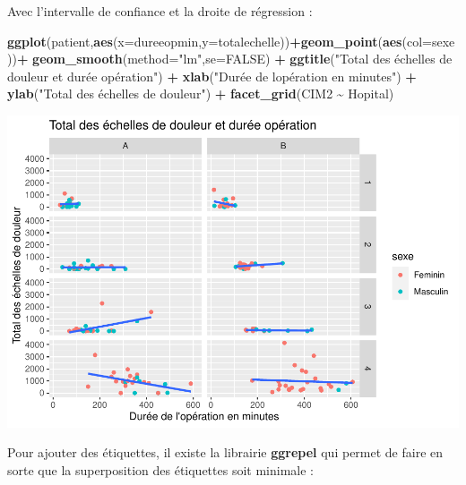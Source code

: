 \documentclass[
]{book}
\newenvironment{Shaded}{\begin{snugshade}}{\end{snugshade}}
\newcommand{\AttributeTok}[1]{\textcolor[rgb]{0.13,0.29,0.53}{#1}}
\newcommand{\ConstantTok}[1]{\textcolor[rgb]{0.56,0.35,0.01}{#1}}
\newcommand{\FunctionTok}[1]{\textcolor[rgb]{0.13,0.29,0.53}{\textbf{#1}}}
\newcommand{\NormalTok}[1]{#1}
\newcommand{\SpecialCharTok}[1]{\textcolor[rgb]{0.81,0.36,0.00}{\textbf{#1}}}
\newcommand{\StringTok}[1]{\textcolor[rgb]{0.31,0.60,0.02}{#1}}
\begin{document}
Avec l'intervalle de confiance et la droite de régression :

\begin{Shaded}
\begin{Highlighting}[]
\FunctionTok{ggplot}\NormalTok{(patient,}\FunctionTok{aes}\NormalTok{(}\AttributeTok{x=}\NormalTok{dureeopmin,}\AttributeTok{y=}\NormalTok{totalechelle))}\SpecialCharTok{+}\FunctionTok{geom\_point}\NormalTok{(}\FunctionTok{aes}\NormalTok{(}\AttributeTok{col=}\NormalTok{sexe))}\SpecialCharTok{+}
  \FunctionTok{geom\_smooth}\NormalTok{(}\AttributeTok{method=}\StringTok{"lm"}\NormalTok{,}\AttributeTok{se=}\ConstantTok{FALSE}\NormalTok{) }\SpecialCharTok{+}
  \FunctionTok{ggtitle}\NormalTok{(}\StringTok{"Total des échelles de douleur et durée opération"}\NormalTok{) }\SpecialCharTok{+} 
  \FunctionTok{xlab}\NormalTok{(}\StringTok{"Durée de l\textquotesingle{}opération en minutes"}\NormalTok{) }\SpecialCharTok{+} 
  \FunctionTok{ylab}\NormalTok{(}\StringTok{"Total des échelles de douleur"}\NormalTok{) }\SpecialCharTok{+}
  \FunctionTok{facet\_grid}\NormalTok{(CIM2 }\SpecialCharTok{\textasciitilde{}}\NormalTok{ Hopital)}
\end{Highlighting}
\end{Shaded}

\includegraphics{_main_files/figure-latex/ggplot20-1.pdf}

Pour ajouter des étiquettes, il existe la librairie \textbf{ggrepel} qui permet
de faire en sorte que la superposition des étiquettes soit minimale :
\end{document}
